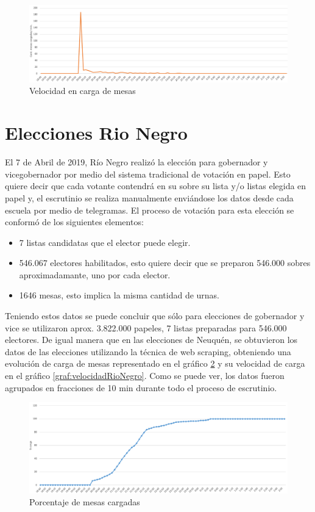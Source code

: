 \begin{figure}[h!]
  \includegraphics[width=1\textwidth]{QOsSnICbyL.png}
  \caption{Velocidad en carga de mesas}
  \label{graf:velocidadNeuquen}
\end{figure}

\section{Elecciones Rio Negro}
El 7 de Abril de 2019, Río Negro realizó la elección para gobernador y vicegobernador por medio del sistema tradicional de votación en papel. Esto quiere decir que cada votante contendrá en su sobre su lista y/o listas elegida en papel y, el escrutinio se realiza manualmente enviándose los datos desde cada escuela por medio de telegramas. El proceso de votación para esta elección se conformó de los siguientes elementos:
\begin{itemize}
    \item 7 listas candidatas que el elector puede elegir.
    \item 546.067 electores habilitados, esto quiere decir que se preparon 546.000 sobres aproximadamante, uno por cada elector.
    \item 1646 mesas, esto implica la misma cantidad de urnas.
\end{itemize}
Teniendo estos datos se puede concluir que sólo para elecciones de gobernador y vice se utilizaron aprox. 3.822.000 papeles, 7 listas preparadas para 546.000 electores. De igual manera que en las elecciones de Neuquén, se obtuvieron los datos de las elecciones utilizando la técnica de web scraping, obteniendo una evolución de carga de mesas representado en el gráfico \ref{graf:porcentajeRioNegro} y su velocidad de carga en el gráfico \ref{graf:velocidadRioNegro}. Como se puede ver, los datos fueron agrupados en fracciones de 10 min durante todo el proceso de escrutinio.

\begin{figure}[h!]
  \includegraphics[width=1\textwidth]{sAveHlGEkX.png}
  \caption{Porcentaje de mesas cargadas}
  \label{graf:porcentajeRioNegro}
\end{figure}


